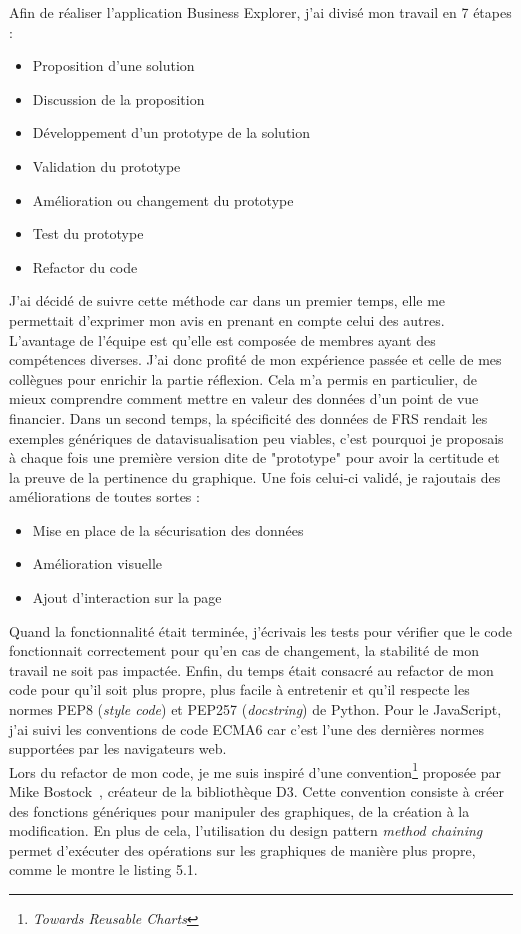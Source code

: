 Afin de réaliser l'application Business Explorer, j'ai divisé mon travail en 7 étapes :
\begin{itemize}
\item Proposition d'une solution
\item Discussion de la proposition
\item Développement d'un prototype de la solution
\item Validation du prototype
\item Amélioration ou changement du prototype
\item Test du prototype
\item Refactor du code
\end{itemize}
J'ai décidé de suivre cette méthode car dans un premier temps, elle me permettait d'exprimer mon avis en prenant en compte celui des autres. L'avantage de l'équipe est qu'elle est composée de membres ayant des compétences diverses. J'ai donc profité de mon expérience passée et celle de mes collègues pour enrichir la partie réflexion. Cela m'a permis en particulier, de mieux comprendre comment mettre en valeur des données d'un point de vue financier. Dans un second temps, la spécificité des données de FRS rendait les exemples génériques de datavisualisation peu viables, c'est pourquoi je proposais à chaque fois une première version dite de "prototype" pour avoir la certitude et la preuve de la pertinence du graphique. Une fois celui-ci validé, je rajoutais des améliorations de toutes sortes :
\begin{itemize}
\item Mise en place de la sécurisation des données
\item Amélioration visuelle
\item Ajout d'interaction sur la page
\end{itemize}
Quand la fonctionnalité était terminée, j'écrivais les tests pour vérifier que le code fonctionnait correctement pour qu'en cas de changement, la stabilité de mon travail ne soit pas impactée. Enfin, du temps était consacré au refactor de mon code pour qu'il soit plus propre, plus facile à entretenir et qu'il respecte les normes PEP8 (\textit{style code}) et PEP257 (\textit{docstring}) de Python. Pour le JavaScript, j'ai suivi les conventions de code ECMA6 car c'est l'une des dernières normes supportées par les navigateurs web. \\

Lors du refactor de mon code, je me suis inspiré d'une convention\footnote{\textit{Towards Reusable Charts}} proposée par Mike Bostock~\cite{reusablecharts}, créateur de la bibliothèque D3. Cette convention consiste à créer des fonctions génériques pour manipuler des graphiques, de la création à la modification. En plus de cela, l'utilisation du design pattern \textit{method chaining} permet d'exécuter des opérations sur les graphiques de manière plus propre, comme le montre le listing 5.1.

